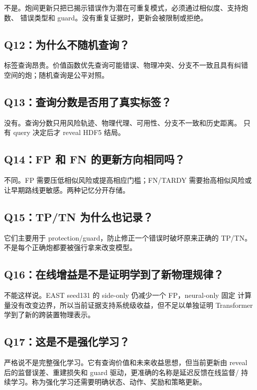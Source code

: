 \documentclass[11pt,a4paper]{article}
\begin{document}
不是。炮间更新只把已揭示错误作为潜在可重复模式，必须通过相似度、支持炮数、
错误类型和 guard。没有重复证据时，更新会被限制或拒绝。

\subsection*{Q12：为什么不随机查询？}

标签查询昂贵。价值函数优先查询可能错误、物理冲突、分支不一致且具有纠错
空间的炮；随机查询是公平对照。

\subsection*{Q13：查询分数是否用了真实标签？}

没有。查询分数只用风险轨迹、物理代理、可用性、分支不一致和历史距离。
只有 query 决定后才 reveal HDF5 结局。

\subsection*{Q14：FP 和 FN 的更新方向相同吗？}

不同。FP 需要压低相似风险或提高相应门槛；FN/TARDY 需要抬高相似风险或
让早期路线更敏感。两种记忆分开存储。

\subsection*{Q15：TP/TN 为什么也记录？}

它们主要用于 protection/guard，防止修正一个错误时破坏原来正确的 TP/TN。
不是每个正确炮都要被强行拿来改变模型。

\subsection*{Q16：在线增益是不是证明学到了新物理规律？}

不能这样说。EAST seed131 的 side-only 仍减少一个 FP，neural-only 固定
计算量没有改变边界，所以当前证据支持系统级收益，但不足以单独证明
Transformer 学到了新的跨装置物理表示。

\subsection*{Q17：这是不是强化学习？}

严格说不是完整强化学习。它有查询价值和未来收益思想，但当前更新由 reveal
后的监督误差、重建损失和 guard 驱动，更准确的名称是延迟反馈在线监督/
持续学习。称为强化学习还需要明确状态、动作、奖励和策略更新。
\end{document}
